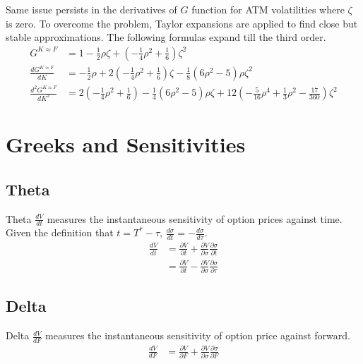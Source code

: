 \documentclass{article}
\begin{document}
Same issue persists in the derivatives of $ G $ function for ATM volatilities where $ \zeta $ is zero.
To overcome the problem, Taylor expansions are applied to find close but stable approximations.
The following formulas expand till the third order.
\begin{subequations}
    \begin{align}
        G^{K \approx F} &= 1 - \frac{1}{2} \rho \zeta + \left(-\frac{1}{4} \rho^2 + \frac{1}{6}\right) \zeta^2 \\
        \frac{d G^{K \approx F}}{d K} &= -\frac{1}{2} \rho  + 2 \left(-\frac{1}{4} \rho^2 + \frac{1}{6}\right) \zeta - \frac{1}{8} \left(6 \rho^2 - 5\right) \rho \zeta^2 \\
        \frac{d^2 G^{K \approx F}}{d K^2} &= 2 \left(-\frac{1}{4} \rho^2 + \frac{1}{6}\right) - \frac{1}{4} \left(6 \rho^2 - 5\right) \rho \zeta + 12 \left(-\frac{5}{16} \rho^4 + \frac{1}{3} \rho^2 - \frac{17}{360}\right) \zeta^2
    \end{align}
\end{subequations}


\section{Greeks and Sensitivities}

\subsection{Theta}
Theta $ \frac{d V}{d t} $ measures the instantaneous sensitivity of option prices against time. Given the definition that $ t = T^* - \tau $, $ \frac{d \sigma}{d t} = -\frac{d \sigma}{d \tau}$.
\begin{align}
    \frac{d V}{d t} &= \frac{\partial V}{\partial t} + \frac{\partial V}{\partial \sigma} \frac{\partial \sigma}{\partial t} \nonumber \\
    &= \frac{\partial V}{\partial t} - \frac{\partial V}{\partial \sigma} \frac{\partial \sigma}{\partial \tau}
\end{align}

\subsection{Delta}
Delta $ \frac{d V}{d F} $ measures the instantaneous sensitivity of option price against forward.
\begin{align}
    \frac{d V}{d F} &= \frac{\partial V}{\partial F} + \frac{\partial V}{\partial \sigma} \frac{\partial \sigma}{\partial F}
\end{align}
\end{document}
